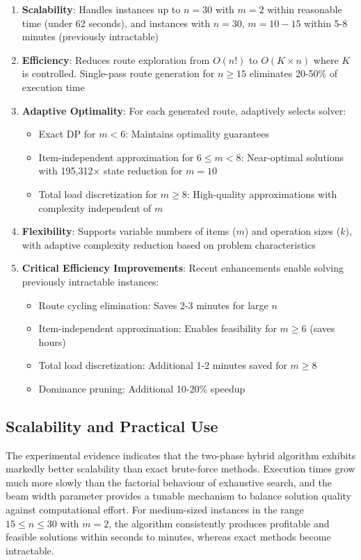 \documentclass[12pt]{article}
\begin{document}
\begin{enumerate}
    \item \textbf{Scalability}: Handles instances up to $n=30$ with $m=2$ within reasonable time (under 62 seconds), and instances with $n=30$, $m=10-15$ within 5-8 minutes (previously intractable)
    \item \textbf{Efficiency}: Reduces route exploration from $O(n!)$ to $O(K \times n)$ where $K$ is controlled. Single-pass route generation for $n \geq 15$ eliminates 20-50\% of execution time
    \item \textbf{Adaptive Optimality}: For each generated route, adaptively selects solver:
    \begin{itemize}
        \item Exact DP for $m < 6$: Maintains optimality guarantees
        \item Item-independent approximation for $6 \leq m < 8$: Near-optimal solutions with 195,312$\times$ state reduction for $m=10$
        \item Total load discretization for $m \geq 8$: High-quality approximations with complexity independent of $m$
    \end{itemize}
    \item \textbf{Flexibility}: Supports variable numbers of items ($m$) and operation sizes ($k$), with adaptive complexity reduction based on problem characteristics
    \item \textbf{Critical Efficiency Improvements}: Recent enhancements enable solving previously intractable instances:
    \begin{itemize}
        \item Route cycling elimination: Saves 2-3 minutes for large $n$
        \item Item-independent approximation: Enables feasibility for $m \geq 6$ (saves hours)
        \item Total load discretization: Additional 1-2 minutes saved for $m \geq 8$
        \item Dominance pruning: Additional 10-20\% speedup
    \end{itemize}
\end{enumerate}

\subsection{Scalability and Practical Use}

The experimental evidence indicates that the two-phase hybrid algorithm exhibits markedly better scalability than exact brute-force methods. Execution times grow much more slowly than the factorial behaviour of exhaustive search, and the beam width parameter provides a tunable mechanism to balance solution quality against computational effort. For medium-sized instances in the range $15 \leq n \leq 30$ with $m=2$, the algorithm consistently produces profitable and feasible solutions within seconds to minutes, whereas exact methods become intractable.
\end{document}
